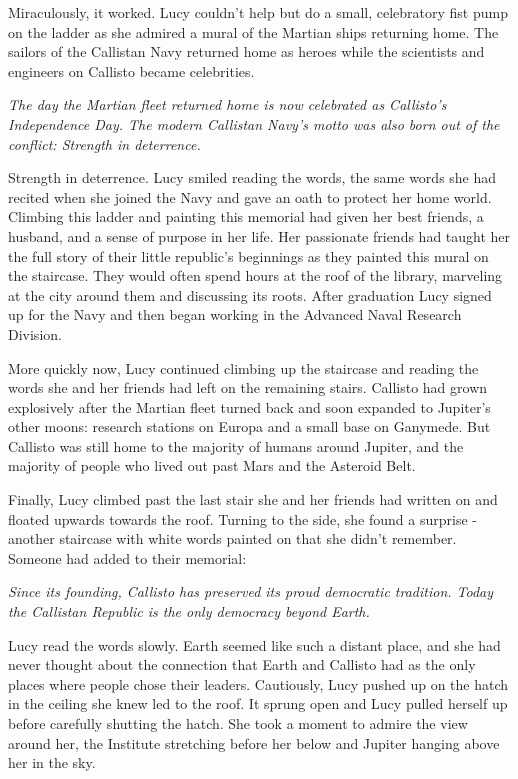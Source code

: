 \documentclass[12pt]{article} %
\begin{document}
Miraculously, it worked. Lucy couldn't help but do a small, celebratory fist pump on the ladder as she admired a mural of the Martian ships returning home. The sailors of the Callistan Navy returned home as heroes while the scientists and engineers on Callisto became celebrities.

\textit{The day the Martian fleet returned home is now celebrated as Callisto's Independence Day. The modern Callistan Navy's motto was also born out of the conflict: Strength in deterrence.}

Strength in deterrence. Lucy smiled reading the words, the same words she had recited when she joined the Navy and gave an oath to protect her home world. Climbing this ladder and painting this memorial had given her best friends, a husband, and a sense of purpose in her life. Her passionate friends had taught her the full story of their little republic's beginnings as they painted this mural on the staircase. They would often spend hours at the roof of the library, marveling at the city around them and discussing its roots. After graduation Lucy signed up for the Navy and then began working in the Advanced Naval Research Division. 

More quickly now, Lucy continued climbing up the staircase and reading the words she and her friends had left on the remaining stairs. Callisto had grown explosively after the Martian fleet turned back and soon expanded to Jupiter's other moons: research stations on Europa and a small base on Ganymede. But Callisto was still home to the majority of humans around Jupiter, and the majority of people who lived out past Mars and the Asteroid Belt.

Finally, Lucy climbed past the last stair she and her friends had written on and floated upwards towards the roof. Turning to the side, she found a surprise - another staircase with white words painted on that she didn't remember. Someone had added to their memorial:

\textit{Since its founding, Callisto has preserved its proud democratic tradition. Today the Callistan Republic is the only democracy beyond Earth.}

Lucy read the words slowly. Earth seemed like such a distant place, and she had never thought about the connection that Earth and Callisto had as the only places where people chose their leaders. Cautiously, Lucy pushed up on the hatch in the ceiling she knew led to the roof. It sprung open and Lucy pulled herself up before carefully shutting the hatch. She took a moment to admire the view around her, the Institute stretching before her below and Jupiter hanging above her in the sky.
\end{document}
